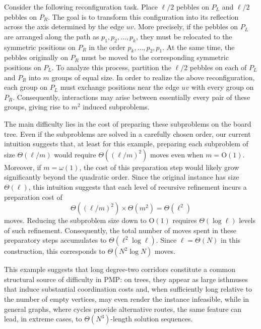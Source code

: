 \documentclass[letter,11pt]{article}
\theoremstyle{definition}
\theoremstyle{definition}
\newcommand{\1}{\boldmath$~1~$\unboldmath}
\newcommand{\Ord}{\mathrm{O}}
\begin{document}
Consider the following reconfiguration task.
Place $\ell/2$ pebbles on $P_L$ and $\ell/2$ pebbles on $P_R$.
The goal is to transform this configuration into its reflection
across the axis determined by the edge $uv$.
More precisely, if the pebbles on $P_L$ are arranged along the path as
$p_1,p_2,\ldots,p_k$, they must be relocated to the symmetric
positions on $P_R$ in the order $p_k,\ldots,p_2,p_1$.
At the same time, the pebbles originally on $P_R$ must be moved to
the corresponding symmetric positions on $P_L$.
To analyze this process, partition the $\ell/2$ pebbles on each of
$P_L$ and $P_R$ into $m$ groups of equal size.
In order to realize the above reconfiguration, each group on $P_L$
must exchange positions near the edge $uv$ with every group on $P_R$.
Consequently, interactions may arise between essentially every pair
of these groups, giving rise to $m^2$ induced subproblems.

The main difficulty lies in the cost of preparing these subproblems
on the board tree.
Even if the subproblems are solved in a carefully chosen order,
our current intuition suggests that, at least for this example,
preparing each subproblem of size $\Theta(\ell/m)$ would require
$\Theta((\ell/m)^2)$ moves even when $m=\Ord(1)$.
Moreover, if $m=\omega(1)$, the cost of this preparation step
would likely grow significantly beyond the quadratic order. 
Since the original instance has size $\Theta(\ell)$, this intuition
suggests that each level of recursive refinement incurs a
preparation cost of
\[
\Theta((\ell/m)^2)\times\Theta(m^2)=\Theta(\ell^2)
\]
moves.
Reducing the subproblem size down to $\Ord(1)$ requires
$\Theta(\log \ell)$ levels of such refinement.
Consequently, the total number of moves spent in these preparatory
steps accumulates to $\Theta(\ell^2 \log \ell)$.
Since $\ell = \Theta(N)$ in this construction, this corresponds to
$\Theta(N^2 \log N)$ moves.

This example suggests that long degree-two corridors constitute a common 
structural source of difficulty in PMP: on trees, they appear as large isthmuses 
that induce substantial coordination costs and, when sufficiently long relative 
to the number of empty vertices, may even render the instance infeasible, 
while in general graphs, where cycles provide alternative routes, the same 
feature can lead, in extreme cases, to $\Theta(N^3)$-length solution sequences.

\end{document}

